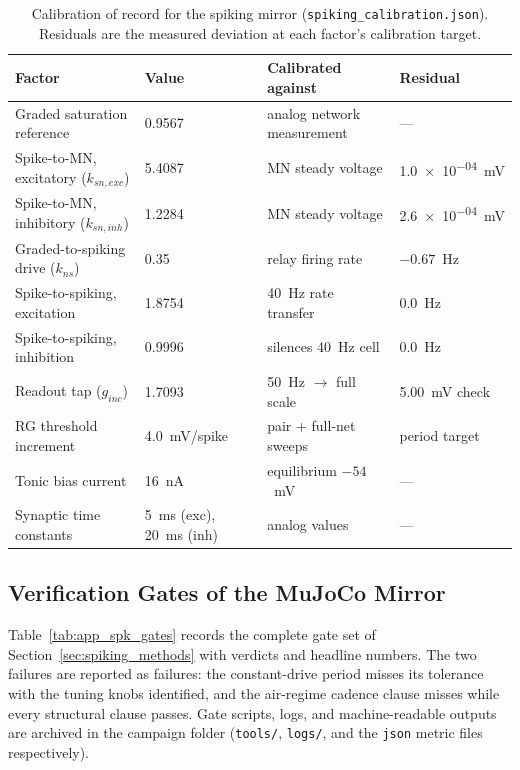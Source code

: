 \begin{table}[htbp]
\caption{Calibration of record for the spiking mirror (\texttt{spiking\_calibration.json}). Residuals are the measured deviation at each factor's calibration target.}
\label{tab:app_spk_cal}
\begin{tabular}{@{}llll@{}}
\toprule
\textbf{Factor} & \textbf{Value} & \textbf{Calibrated against} & \textbf{Residual} \\
\midrule
Graded saturation reference & 0.9567 & analog network measurement & --- \\
Spike-to-MN, excitatory ($k_{sn,exc}$) & 5.4087 & MN steady voltage & \qty{1.0e-04}{\mV} \\
Spike-to-MN, inhibitory ($k_{sn,inh}$) & 1.2284 & MN steady voltage & \qty{2.6e-04}{\mV} \\
Graded-to-spiking drive ($k_{ns}$) & 0.35 & relay firing rate & $-0.67$~Hz \\
Spike-to-spiking, excitation & 1.8754 & \qty{40}{\hertz} rate transfer & \qty{0.0}{\hertz} \\
Spike-to-spiking, inhibition & 0.9996 & silences \qty{40}{\hertz} cell & \qty{0.0}{\hertz} \\
Readout tap ($g_{inc}$) & 1.7093 & \qty{50}{\hertz} $\to$ full scale & \qty{5.00}{\mV} check \\
RG threshold increment & 4.0~mV/spike & pair + full-net sweeps & period target \\
Tonic bias current & 16~nA & equilibrium $-54$~mV & --- \\
Synaptic time constants & 5~ms (exc), 20~ms (inh) & analog values & --- \\
\bottomrule
\end{tabular}
\end{table}

\subsection{Verification Gates of the MuJoCo Mirror}

Table~\ref{tab:app_spk_gates} records the complete gate set of Section~\ref{sec:spiking_methods} with verdicts and headline numbers. The two failures are reported as failures: the constant-drive period misses its tolerance with the tuning knobs identified, and the air-regime cadence clause misses while every structural clause passes. Gate scripts, logs, and machine-readable outputs are archived in the campaign folder (\texttt{tools/}, \texttt{logs/}, and the \texttt{json} metric files respectively).

